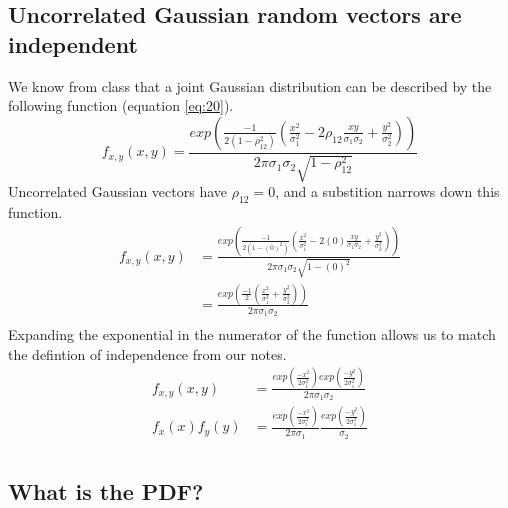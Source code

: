 \documentclass[12pt,letterpaper, onecolumn]{exam}
\begin{document}
\begin{questions}
\begin{parts}
		\part{Uncorrelated Gaussian random vectors are independent}
		\solution
		We know from class that a joint Gaussian distribution can be described by the following function (equation \ref{eq:20}).
		\begin{equation}\label{eq:20}
			f_{x,y}(x,y) = \frac{exp\left(\frac{-1}{2(1 - \rho_{12}^2)}\left(\frac{x^2}{\sigma_1^2} - 2\rho_{12}\frac{xy}{\sigma_1\sigma_2}+\frac{y^2}{\sigma^2_2}\right) \right)}{2\pi\sigma_1\sigma_2\sqrt{1 - \rho_{12}^2}}
		\end{equation}
		Uncorrelated Gaussian vectors have $\rho_{12} = 0$, and a substition narrows down this function.
		\begin{equation}
			\begin{split}
				f_{x,y}(x,y) & = \frac{exp\left(\frac{-1}{2(1 - (0)^2)}\left(\frac{x^2}{\sigma_1^2} - 2(0)\frac{xy}{\sigma_1\sigma_2}+\frac{y^2}{\sigma^2_2}\right) \right)}{2\pi\sigma_1\sigma_2\sqrt{1 - (0)^2}}\\
				& = \frac{exp\left(\frac{-1}{2}\left(\frac{x^2}{\sigma_1^2}+\frac{y^2}{\sigma^2_2}\right) \right)}{2\pi\sigma_1\sigma_2}\\
			\end{split}
		\end{equation}
		Expanding the exponential in the numerator of the function allows us to match the defintion of independence from our notes.
		\begin{equation}
			\begin{split}
				f_{x,y}(x,y) & = \frac{exp\left(\frac{-x^2}{2\sigma_1^2}\right)exp\left(\frac{-y^2}{2\sigma_1^2}\right)}{2\pi\sigma_1\sigma_2}\\
				f_{x}(x)f_{y}(y) & = \frac{exp\left(\frac{-x^2}{2\sigma_1^2}\right)}{2\pi\sigma_1}\frac{exp\left(\frac{-y^2}{2\sigma_1^2}\right)}{\sigma_2}\\
			\end{split}
		\end{equation}
	\end{parts}
	\clearpage
	\begin{parts}
		\part{What is the PDF?}

\end{parts}
\end{questions}
\end{document}
